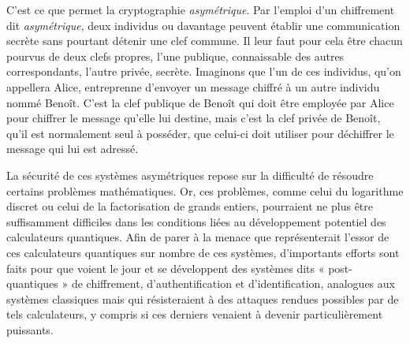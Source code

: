 C’est ce que permet la cryptographie \emph{asymétrique}.
Par l’emploi d’un chiffrement dit \emph{asymétrique}, deux individus ou davantage peuvent établir une communication secrète sans pourtant détenir une clef commune.
Il leur faut pour cela être chacun pourvus de deux clefs propres, l’une publique, connaissable des autres correspondants, l’autre privée, secrète. 
Imaginons que l’un de ces individus, qu’on appellera Alice, entreprenne d’envoyer un message chiffré à un autre individu nommé Benoît. C’est la clef publique de Benoît qui doit être employée par Alice pour chiffrer le message qu’elle lui destine, mais c’est la clef privée de Benoît, qu’il est normalement seul à posséder, que celui-ci doit utiliser pour déchiffrer le message qui lui est adressé.

La sécurité de ces systèmes asymétriques repose sur la difficulté de résoudre certains problèmes mathématiques.
Or, ces problèmes, comme celui du logarithme discret ou celui de la factorisation de
grands entiers, pourraient ne plus être suffisamment difficiles dans les conditions liées au
développement potentiel des calculateurs quantiques.
Afin de parer à la menace que représenterait l’essor de ces calculateurs quantiques sur nombre de ces systèmes, d’importants efforts sont faits pour que voient le jour et se développent des
systèmes dits « post-quantiques » de chiffrement, d’authentification et d’identification, analogues aux systèmes classiques
mais qui résisteraient à des attaques rendues possibles par de tels calculateurs, y compris si ces derniers venaient à
devenir particulièrement puissants.










